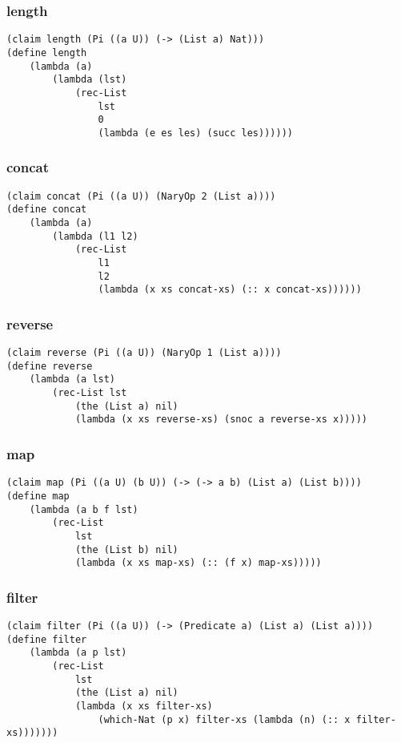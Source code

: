 \subsubsection{length} \label{code:length}
\begin{lstlisting}
(claim length (Pi ((a U)) (-> (List a) Nat)))
(define length
    (lambda (a)
        (lambda (lst)
            (rec-List
                lst
                0
                (lambda (e es les) (succ les))))))
\end{lstlisting}

\subsubsection{concat} \label{code:concat}
\begin{lstlisting}
(claim concat (Pi ((a U)) (NaryOp 2 (List a))))
(define concat
    (lambda (a)
        (lambda (l1 l2)
            (rec-List
                l1
                l2
                (lambda (x xs concat-xs) (:: x concat-xs))))))
\end{lstlisting}

\subsubsection{reverse} \label{code:reverse}
\begin{lstlisting}
(claim reverse (Pi ((a U)) (NaryOp 1 (List a))))
(define reverse
    (lambda (a lst)
        (rec-List lst
            (the (List a) nil)
            (lambda (x xs reverse-xs) (snoc a reverse-xs x)))))
\end{lstlisting}

\subsubsection{map} \label{code:map}
\begin{lstlisting}
(claim map (Pi ((a U) (b U)) (-> (-> a b) (List a) (List b))))
(define map
    (lambda (a b f lst)
        (rec-List
            lst
            (the (List b) nil)
            (lambda (x xs map-xs) (:: (f x) map-xs)))))
\end{lstlisting}

\subsubsection{filter} \label{code:filter}
\begin{lstlisting}
(claim filter (Pi ((a U)) (-> (Predicate a) (List a) (List a))))
(define filter
    (lambda (a p lst)
        (rec-List
            lst
            (the (List a) nil)
            (lambda (x xs filter-xs)
                (which-Nat (p x) filter-xs (lambda (n) (:: x filter-xs)))))))
\end{lstlisting}

